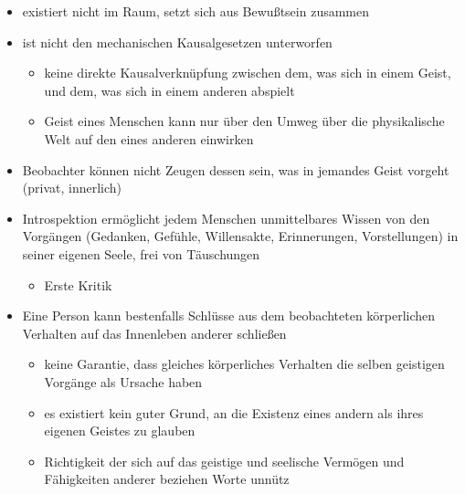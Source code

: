 \documentclass[landscape, twocolumn]{article}
\begin{document}
        \begin{itemize}
            \item
                existiert nicht im Raum, setzt sich aus Bewußtsein zusammen
            \item
                ist nicht den mechanischen Kausalgesetzen unterworfen
                \begin{itemize}
                    \item
                        keine direkte Kausalverknüpfung zwischen dem, was sich in einem Geist, und dem, was sich in einem anderen abspielt
                    \item
                        Geist eines Menschen kann nur über den Umweg über die physikalische Welt auf den eines anderen einwirken
                \end{itemize}
            \item
                Beobachter können nicht Zeugen dessen sein, was in jemandes Geist vorgeht (privat, innerlich)
            \item
                Introspektion ermöglicht jedem Menschen unmittelbares Wissen von den Vorgängen (Gedanken, Gefühle, Willensakte, Erinnerungen, Vorstellungen) in seiner eigenen Seele, frei von Täuschungen
                \begin{itemize}
                    \item
                        Erste Kritik
                
                \end{itemize}

            \item
                Eine Person kann bestenfalls Schlüsse aus dem beobachteten körperlichen Verhalten auf das Innenleben anderer schließen
                \begin{itemize}
                    \item
                        keine Garantie, dass gleiches körperliches Verhalten die selben geistigen Vorgänge als Ursache haben
                    \item
                        es existiert kein guter Grund, an die Existenz eines andern als ihres eigenen Geistes zu glauben
                    \item
                        Richtigkeit der sich auf das geistige und seelische Vermögen und Fähigkeiten anderer beziehen Worte unnütz
                \end{itemize}
\end{itemize}
\end{document}
